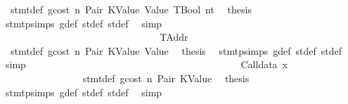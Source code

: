 \begin{isabellebody}
\ {}{\isacharparenleft}{\kern0pt}{}{\isacharparenright}{\kern0pt}\ stmt{\isacharunderscore}{\kern0pt}def\ gcost\ n\ Pair\ KValue\ Value\ TBool\ nt\ \isamarkupfalse%
\ {\isacharquery}{\kern0pt}thesis\ \isamarkupfalse%
\ stmt{\isachardot}{\kern0pt}psimps{\isacharparenleft}{\kern0pt}{}{\isacharparenright}{\kern0pt}\ g{\isacharunderscore}{\kern0pt}def\ st{\isacharprime}{\kern0pt}{\isacharunderscore}{\kern0pt}def\ st{\isacharprime}{\kern0pt}{\isacharprime}{\kern0pt}{\isacharunderscore}{\kern0pt}def\ \isamarkupfalse%
\ simp\isanewline
\ \ \ \ \ \ \ \ \ \ \ \ \ \ \ \ \ \ \isamarkupfalse%
\isanewline
\ \ \ \ \ \ \ \ \ \ \ \ \ \ \ \ \isamarkupfalse%
\isanewline
\ \ \ \ \ \ \ \ \ \ \ \ \ \ \isamarkupfalse%
\isanewline
\ \ \ \ \ \ \ \ \ \ \ \ \ \ \ \ \isamarkupfalse%
\ TAddr\isanewline
\ \ \ \ \ \ \ \ \ \ \ \ \ \ \ \ \isamarkupfalse%
\ {}{\isacharparenleft}{\kern0pt}{}{\isacharparenright}{\kern0pt}\ stmt{\isacharunderscore}{\kern0pt}def\ gcost\ n\ Pair\ KValue\ Value\ \isamarkupfalse%
\ {\isacharquery}{\kern0pt}thesis\ \isamarkupfalse%
\ stmt{\isachardot}{\kern0pt}psimps{\isacharparenleft}{\kern0pt}{}{\isacharparenright}{\kern0pt}\ g{\isacharunderscore}{\kern0pt}def\ st{\isacharprime}{\kern0pt}{\isacharunderscore}{\kern0pt}def\ st{\isacharprime}{\kern0pt}{\isacharprime}{\kern0pt}{\isacharunderscore}{\kern0pt}def\ \isamarkupfalse%
\ simp\isanewline
\ \ \ \ \ \ \ \ \ \ \ \ \ \ \isamarkupfalse%
\isanewline
\ \ \ \ \ \ \ \ \ \ \ \ \isamarkupfalse%
\isanewline
\ \ \ \ \ \ \ \ \ \ \ \ \ \ \isamarkupfalse%
\ {\isacharparenleft}{\kern0pt}Calldata\ x{}{\isacharparenright}{\kern0pt}\isanewline
\ \ \ \ \ \ \ \ \ \ \ \ \ \ \isamarkupfalse%
\ {}{\isacharparenleft}{\kern0pt}{}{\isacharparenright}{\kern0pt}\ stmt{\isacharunderscore}{\kern0pt}def\ gcost\ n\ Pair\ KValue\ \isamarkupfalse%
\ {\isacharquery}{\kern0pt}thesis\ \isamarkupfalse%
\ stmt{\isachardot}{\kern0pt}psimps{\isacharparenleft}{\kern0pt}{}{\isacharparenright}{\kern0pt}\ g{\isacharunderscore}{\kern0pt}def\ st{\isacharprime}{\kern0pt}{\isacharunderscore}{\kern0pt}def\ st{\isacharprime}{\kern0pt}{\isacharprime}{\kern0pt}{\isacharunderscore}{\kern0pt}def\ \isamarkupfalse%
\ simp\isanewline
\ \ \ \ \ \ \ \ \ \ \ \ \isamarkupfalse%

\end{isabellebody}
